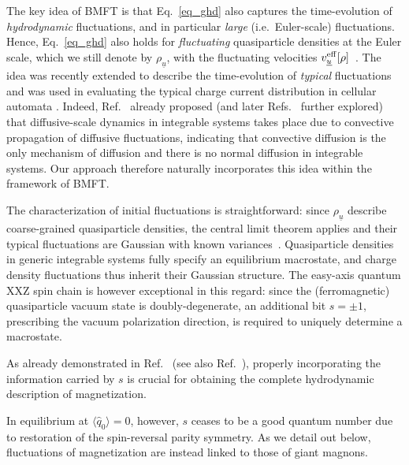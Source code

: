 \documentclass[
twocolumn,
amsfonts,
showpacs,
superscriptaddress,
amsmath,
amssymb,
aps,
longbibliography,
prl,
noeprint
]{revtex4-2}
\newcommand{\ch}[1]{{\color{black}  #1}}
\newcommand{\uu}{\underline{u}}
\newcommand{\veff}{v^\eff}
\newcounter{ls}
\newcommand{\1}{{\bf 1}}
\newcommand{\eff}{{\rm eff}}
\begin{document}
The key idea of BMFT is that Eq.~\eqref{eq_ghd} also captures the time-evolution of {\it hydrodynamic} fluctuations, and in particular {\it large} (i.e.~Euler-scale) fluctuations. \ch{Hence,} Eq.~\eqref{eq_ghd} also holds for {\it fluctuating} quasiparticle densities at the Euler scale, which we still denote by $\rho_{\underline{u}}$, with the fluctuating velocities $\veff_{\uu}[\rho]$~\cite{BMFT,Doyon2023longrange}. The idea was recently extended to describe the time-evolution of {\it typical} fluctuations and was used in evaluating the typical charge current distribution in cellular automata \cite{Yoshimura2025,Yoshimura2025_2}. \ch{Indeed, Ref.~\cite{Medenjak2020} already proposed (and later Refs.~\cite{gopalakrishnan2024nongaussian,Yoshimura2025,McCulloch2025,Yoshimura2025_2} further explored) that diffusive-scale dynamics in integrable systems takes place due to convective propagation of diffusive fluctuations, indicating that convective diffusion is the only mechanism of diffusion and there is no normal diffusion in integrable systems. Our approach therefore naturally incorporates this idea within the framework of BMFT.}


The characterization of initial fluctuations is straightforward:
since $\rho_{\uu}$ describe coarse-grained quasiparticle densities, the central limit theorem applies and their typical fluctuations are Gaussian with known variances~\cite{Doyon_GHD_lecture}.  Quasiparticle densities in generic integrable systems fully specify an equilibrium macrostate, and charge density fluctuations thus inherit their Gaussian structure. The easy-axis quantum XXZ spin chain is however exceptional in this regard: since the (ferromagnetic) quasiparticle vacuum state is doubly-degenerate, an additional bit $s = \pm1 $, prescribing the vacuum polarization direction, is required to uniquely determine a macrostate.

As already demonstrated in Ref.~\cite{Piroli2017} (see also Ref.~\cite{Bastianello2022_AB}), properly incorporating the information carried by $s$ is crucial for obtaining the complete hydrodynamic description of magnetization.

\ch{In equilibrium at $\langle \hat{q}_{0}\rangle=0$, however, $s$ ceases to be a good quantum number due to restoration of the spin-reversal parity symmetry. As we detail out below, fluctuations of magnetization are instead linked to those of giant magnons.}
\end{document}
